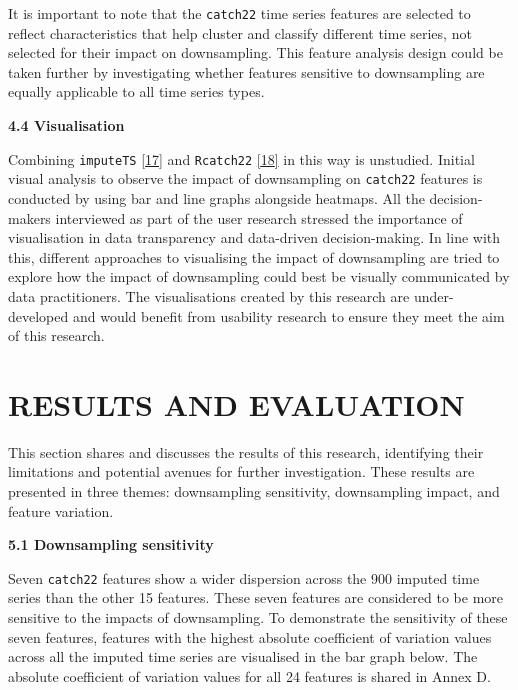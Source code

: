 \documentclass{article}
\begin{document}
It is important to note that the \texttt{catch22} time series features
are selected to reflect characteristics that help cluster and classify
different time series, not selected for their impact on downsampling.
This feature analysis design could be taken further by investigating
whether features sensitive to downsampling are equally applicable to all
time series types.

\textbf{4.4 Visualisation}

Combining \texttt{imputeTS} \protect\hyperlink{ref-imputeTS_R}{{[}17{]}}
and \texttt{Rcatch22} \protect\hyperlink{ref-catch22_R}{{[}18{]}} in
this way is unstudied. Initial visual analysis to observe the impact of
downsampling on \texttt{catch22} features is conducted by using bar and
line graphs alongside heatmaps. All the decision-makers interviewed as
part of the user research stressed the importance of visualisation in
data transparency and data-driven decision-making. In line with this,
different approaches to visualising the impact of downsampling are tried
to explore how the impact of downsampling could best be visually
communicated by data practitioners. The visualisations created by this
research are under-developed and would benefit from usability research
to ensure they meet the aim of this research.

\hypertarget{results-and-evaluation}{%
\section{RESULTS AND EVALUATION}\label{results-and-evaluation}}

\vspace{-0.4cm}

This section shares and discusses the results of this research,
identifying their limitations and potential avenues for further
investigation. These results are presented in three themes: downsampling
sensitivity, downsampling impact, and feature variation.

\newpage

\textbf{5.1 Downsampling sensitivity}

Seven \texttt{catch22} features show a wider dispersion across the 900
imputed time series than the other 15 features. These seven features are
considered to be more sensitive to the impacts of downsampling. To
demonstrate the sensitivity of these seven features, features with the
highest absolute coefficient of variation values across all the imputed
time series are visualised in the bar graph below. The absolute
coefficient of variation values for all 24 features is shared in Annex
D.
\end{document}
